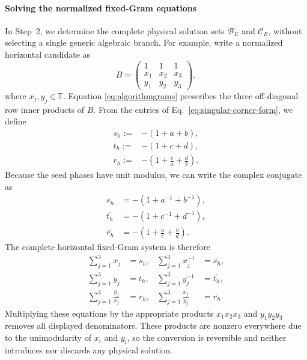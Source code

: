 \documentclass[aps,prx,reprint,nofootinbib,twoside,superscriptaddress,longbibliography,floatfix]{revtex4-2}
\theoremstyle{definition}
\newcommand{\T}{\mathbb T}
\begin{document}
\paragraph*{Solving the normalized fixed-Gram equations} In Step~2, we determine the complete physical solution sets $\mathcal B_E$ and $\mathcal C_E$, without selecting a single generic algebraic branch. For example, write a normalized horizontal candidate as 
\begin{equation} 
B= 
\begin{pmatrix} 
1&1&1\\ x_1&x_2&x_3\\ y_1&y_2&y_3 \end{pmatrix}, 
\label{eq:main-fixed-gram-coordinate-form} 
\end{equation} 
where $x_j,y_j\in\T$.
Equation \ref{eq:algorithmgrams} prescribes the three off-diagonal row inner products of $B$.
%
From the entries of Eq.~\ref{eq:singular-corner-form}, we define
\begin{equation}
\begin{split}
   s_h:=&-(1+a+b),\\
    t_h:=&-(1+c+d),\\
    r_h:=&-\left(1+\frac ca+\frac db\right). 
\end{split}
\label{eq:trace-data-main}
\end{equation}
Because the seed phases have unit modulus, we can write the complex conjugate as
\begin{equation}
\begin{aligned}
\overline{s_h}&=-(1+a^{-1}+b^{-1}),\\
\overline{t_h}&=-(1+c^{-1}+d^{-1}),\\
\overline{r_h}&=-\left(1+\frac ac+\frac bd\right).
\end{aligned}
\end{equation}
The complete horizontal fixed-Gram system is therefore
\begin{equation}
\begin{aligned}
\sum_{j=1}^3x_j&=s_h,
&\sum_{j=1}^3x_j^{-1}&=\overline{s_h},\\
\sum_{j=1}^3y_j&=t_h,
&\sum_{j=1}^3y_j^{-1}&=\overline{t_h},\\
\sum_{j=1}^3\frac{y_j}{x_j}&=r_h,
&\sum_{j=1}^3\frac{x_j}{y_j}&=\overline{r_h}.
\end{aligned}
\label{eq:main-fixed-gram-sums}
\end{equation}
Multiplying these equations by the appropriate products $x_1x_2x_3$ and $y_1y_2y_3$ removes all displayed denominators. These
products are nonzero everywhere due to the unimodularity of $x_{i}$ and $y_{i}$, so the conversion is reversible and neither introduces nor discards any physical solution.
\end{document}
